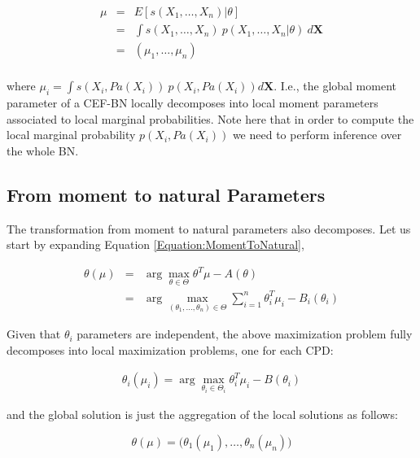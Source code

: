 \documentclass[11pt, oneside]{article}   	%
\newcommand{\bm}{\mathbf}
\numberwithin{figure}{section}
\numberwithin{equation}{section}
\numberwithin{table}{section}
\newcommand{\e}[1]{E\left[ #1 \right]}
\theoremstyle{definition}
\begin{document}
\begin{equation}
\begin{array}{lll}
\mu & = & \e{s(X_1,\ldots, X_n)|\theta} \\
&=& \int s(X_1,\ldots, X_n)~p(X_1,\ldots, X_n|\theta)~d\bm X\\
&=& (\mu_1,\ldots,\mu_n) \\
\end{array}
\end{equation}

\noindent where $\mu_i= \int s(X_i,Pa(X_i))~p(X_i,Pa(X_i))d\bm X$. I.e., the global moment parameter of a CEF-BN locally decomposes into local moment parameters associated to local marginal probabilities. Note here that in order to compute the local marginal probability $p(X_i,Pa(X_i))$ we need to perform inference over the whole BN.

\subsection{From moment to natural Parameters} \label{Section:CEFBN:MomentToNatural}

The transformation from moment to natural parameters also decomposes. Let us start by expanding Equation \ref{Equation:MomentToNatural}, 

\begin{eqnarray}
\label{Equation:CEFBN_MomentToNatural}
\theta(\mu) &=& \arg\max_{\theta\in\Theta} \theta^T\mu
-A(\theta)\nonumber \\
&=& \arg\max_{(\theta_1,\ldots, \theta_n) \in\Theta} \sum_{i=1}^n \theta_i^T \mu_i - B_i(\theta_i) 
\end{eqnarray}

Given that $\theta_i$ parameters are independent, the above maximization problem fully decomposes into local maximization problems, one for each CPD:  

\begin{eqnarray}
\label{Equation:CEFBN_MomentToNaturalLocal}
\theta_i(\mu_i) = \arg\max_{\theta_i\in\Theta_i} \theta_i^T\mu_i - B(\theta_i)
\end{eqnarray}

\noindent and the global solution is just the aggregation of the local solutions as follows: 

$$ \theta(\mu) = \big(\theta_1(\mu_1), \ldots, \theta_n(\mu_n)\big)$$
\end{document}
